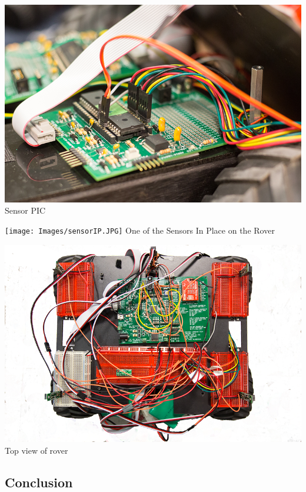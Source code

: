\begin{center}
\includegraphics[scale=0.35]{Images/sensor.png}
Sensor PIC
\end{center}
\begin{center}
\texttt{[image: Images/sensorIP.JPG]}
One of the Sensors In Place on the Rover
\end{center}
\begin{center}
\includegraphics[scale=0.35]{Images/rover.png}
Top view of rover
\end{center}

\subsection{Conclusion}



